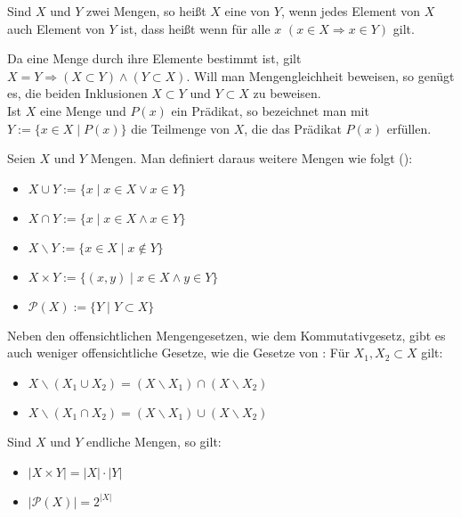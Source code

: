 \begin{definition}[Teilmenge]
	Sind $X$ und $Y$ zwei Mengen, so heißt $X$ eine  von 
	$Y$, wenn jedes Element von $X$ auch Element von $Y$ ist, dass heißt wenn für alle 
	$x$ $(x \in X \Rightarrow x \in Y)$ gilt.
\end{definition}

Da eine Menge durch ihre Elemente bestimmt ist, gilt $X = Y \Rightarrow (X \subset Y)\land
(Y \subset X)$. Will man Mengengleichheit beweisen, so genügt es, die beiden Inklusionen
$X \subset Y$ und $Y \subset X$ zu beweisen. \\


Ist $X$ eine Menge und $P(x)$ ein Prädikat, so bezeichnet man mit $Y:= \{x \in X \mid
P(x)\}$ die Teilmenge von $X$, die das Prädikat $P(x)$ erfüllen. \\

\begin{definition}[Mengenoperationen]
	Seien $X$ und $Y$ Mengen. Man definiert daraus 
	weitere Mengen wie folgt ():
	\begin{itemize}
		\item $X \cup Y := \{x \mid x \in X \lor x \in Y\}$
		\item $X \cap Y := \{x \mid x \in X \land x \in Y\}$
		\item $X \backslash Y := \{x \in X \mid x \notin Y\}$
		\item $X \times Y := \{(x,y) \mid x \in X \land y \in Y\}$
		\item $\mathcal P(X) := \{Y \mid Y \subset X\}$
	\end{itemize}
\end{definition}

Neben den offensichtlichen Mengengesetzen, wie dem Kommutativgesetz, gibt es auch weniger 
offensichtliche Gesetze, wie die Gesetze von : Für $X_1, X_2 \subset X$ gilt:
\begin{itemize}
	\item $X \backslash (X_1 \cup X_2) = (X \backslash X_1) \cap (X \backslash X_2)$
	\item $X \backslash (X_1 \cap X_2) = (X \backslash X_1) \cup (X \backslash X_2)$
\end{itemize}


Sind $X$ und $Y$ endliche Mengen, so gilt:
\begin{itemize}
	\item $|X \times Y| = |X| \cdot |Y|$
	\item $|\mathcal P(X)| = 2^{|X|}$
\end{itemize}